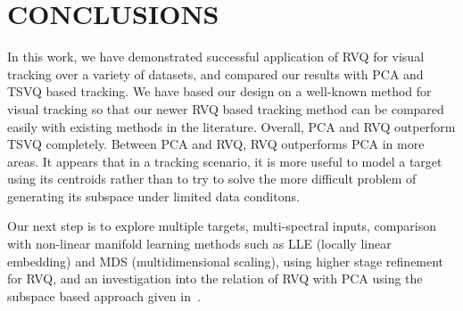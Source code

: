 \documentclass{article}
\begin{document}
\section{CONCLUSIONS}
In this work, we have demonstrated successful application of RVQ for visual tracking over a variety of datasets, and compared our results with PCA and TSVQ based tracking.  We have based our design on a well-known method for visual tracking so that our newer RVQ based tracking method can be compared easily with existing methods in the literature.  Overall, PCA and RVQ outperform TSVQ completely.  Between PCA and RVQ, RVQ outperforms PCA in more areas.  It appears that in a tracking scenario, it is more useful to model a target using its centroids rather than to try to solve the more difficult problem of generating its subspace under limited data conditons.  

Our next step is to explore multiple targets, multi-spectral inputs, comparison with non-linear manifold learning methods such as LLE (locally linear embedding) and MDS (multidimensional scaling), using higher stage refinement for RVQ, and an investigation into the relation of RVQ with PCA using the subspace based approach given in~\cite{2004_CNF_KmeansVsPCA_DingHe}.




\end{document}
